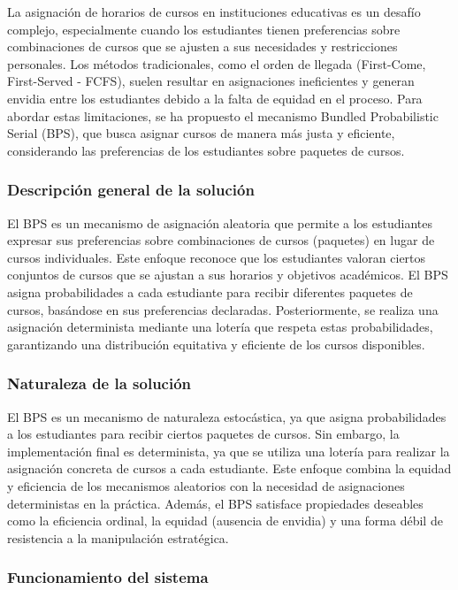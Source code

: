 \documentclass{article}
\begin{document}
La asignación de horarios de cursos en instituciones educativas es un desafío complejo, especialmente cuando los estudiantes tienen preferencias sobre combinaciones de cursos que se ajusten a sus necesidades y restricciones personales. Los métodos tradicionales, como el orden de llegada (First-Come, First-Served - FCFS), suelen resultar en asignaciones ineficientes y generan envidia entre los estudiantes debido a la falta de equidad en el proceso. Para abordar estas limitaciones, se ha propuesto el mecanismo Bundled Probabilistic Serial (BPS), que busca asignar cursos de manera más justa y eficiente, considerando las preferencias de los estudiantes sobre paquetes de cursos.

\subsubsection{Descripción general de la solución}

El BPS es un mecanismo de asignación aleatoria que permite a los estudiantes expresar sus preferencias sobre combinaciones de cursos (paquetes) en lugar de cursos individuales. Este enfoque reconoce que los estudiantes valoran ciertos conjuntos de cursos que se ajustan a sus horarios y objetivos académicos. El BPS asigna probabilidades a cada estudiante para recibir diferentes paquetes de cursos, basándose en sus preferencias declaradas. Posteriormente, se realiza una asignación determinista mediante una lotería que respeta estas probabilidades, garantizando una distribución equitativa y eficiente de los cursos disponibles.

\subsubsection{Naturaleza de la solución}

El BPS es un mecanismo de naturaleza estocástica, ya que asigna probabilidades a los estudiantes para recibir ciertos paquetes de cursos. Sin embargo, la implementación final es determinista, ya que se utiliza una lotería para realizar la asignación concreta de cursos a cada estudiante. Este enfoque combina la equidad y eficiencia de los mecanismos aleatorios con la necesidad de asignaciones deterministas en la práctica. Además, el BPS satisface propiedades deseables como la eficiencia ordinal, la equidad (ausencia de envidia) y una forma débil de resistencia a la manipulación estratégica.

\subsubsection{Funcionamiento del sistema}
\end{document}
